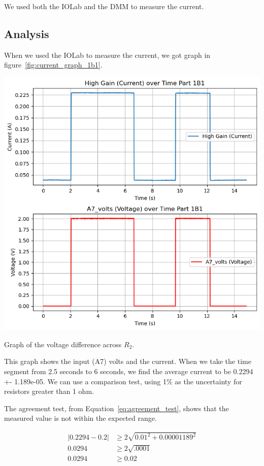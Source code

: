 \documentclass[11pt]{article}
\begin{document}
    We used both the IOLab and the DMM to measure the current.

    \subsection{Analysis}\label{subsec:current_analysis}

    When we used the IOLab to measure the current, we got graph in figure~\ref{fig:current_graph_1b1}.
    \begin{f}[h!]
        \begin{center}
            \includegraphics[width=1.0\linewidth]{resources/images/part1b1_voltage_over_time}
        \end{center}
        \caption{Graph of the voltage difference across $R_2$.}
        \label{fig:current_graph_1b1}
    \end{f}

    This graph shows the input (A7) volts and the current.
    When we take the time segment from 2.5 seconds to 6 seconds, we find the average current to be 0.2294 +- 1.189e-05.
    We can use a comparison test, using 1\% as the uncertainty for resistors greater than 1 ohm.

    The agreement test, from Equation~\ref{eq:agreement_test}, shows that the measured value is not within the expected range.
    \begin{e}
        \begin{align*}
            |0.2294 - 0.2| &\ge 2 \sqrt{0.01^2 + 0.00001189^2} \\
            0.0294 &\ge 2 \sqrt{.0001} \\
            0.0294 &\ge 0.02
        \end{align*}
    \end{e}
\end{document}
